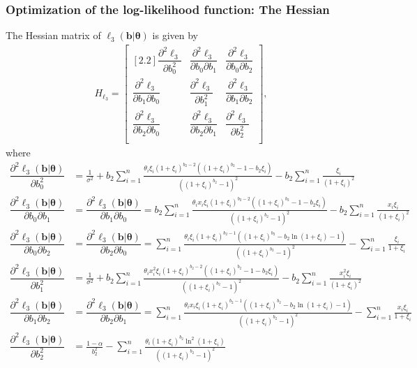\documentclass[11pt, letterpaper]{article}
\begin{document}
\subsubsection{Optimization of the log-likelihood function: The Hessian}
The Hessian matrix of $\ell_3(\bm b | \bm \theta)$ is given by
\begin{align*}
H_{\ell_3} = \begin{bmatrix}[2.2]
\dfrac{\partial^2 \ell_3}{\partial b_0 ^2} & \dfrac{\partial^2 \ell_3}{\partial b_0 \partial b_1} & \dfrac{\partial^2 \ell_3}{\partial b_0 \partial b_2} \\
\dfrac{\partial^2 \ell_3}{\partial b_1  \partial b_0} & \dfrac{\partial^2 \ell_3}{\partial b_1^2} & \dfrac{\partial^2 \ell_3}{\partial b_1 \partial b_2} \\
\dfrac{\partial^2 \ell_3}{\partial b_2  \partial b_0}  & \dfrac{\partial^2 \ell_3}{\partial b_2 \partial b_1} & \dfrac{\partial^2 \ell_3}{\partial b_2^2}\\
\end{bmatrix},
\end{align*}
where
\begin{align*}
\dfrac{\partial^2 \ell_3(\bm b | \bm \theta)}{\partial b_0 ^2} &=  \frac{1}{\sigma^2} + b_2 \sum_{i=1}^n \frac{\theta_i \xi_i (1+\xi_i)^{b_2-2}((1+\xi_i)^{b_2} - 1 - b_2 \xi_i)}{\left((1+\xi_i)^{b_2} - 1 \right)^2} -b_2 \sum_{i=1}^n \frac{ \xi_i}{(1+\xi_i )^2}\\
\dfrac{\partial^2 \ell_3(\bm b | \bm \theta)}{\partial b_0 \partial b_1} &= \dfrac{\partial^2 \ell_3(\bm b | \bm \theta)}{\partial b_1 \partial b_0} =  b_2 \sum_{i=1}^n \frac{\theta_ix_i \xi_i (1+\xi_i)^{b_2-2}((1+\xi_i)^{b_2} - 1 - b_2 \xi_i)}{\left((1+\xi_i)^{b_2} - 1 \right)^2} -b_2 \sum_{i=1}^n \frac{x_i \xi_i}{(1+\xi_i )^2}\\
\dfrac{\partial^2 \ell_3(\bm b | \bm \theta)}{\partial b_0 \partial b_2} &= \dfrac{\partial^2 \ell_3(\bm b | \bm \theta)}{\partial b_2 \partial b_0} = \sum_{i=1}^n \frac{\theta_i\xi_i(1+\xi_i)^{b_2-1}\left((1+\xi_i)^{b_2}- b_2 \ln (1+\xi_i) -1 \right)}{\left((1+\xi_i)^{b_2} - 1 \right)^2} - \sum_{i=1}^n \frac{\xi_i}{1+\xi_i}\\
\dfrac{\partial^2 \ell_3(\bm b | \bm \theta)}{\partial b_1 ^2} &= \frac{1}{\sigma^2} + b_2 \sum_{i=1}^n \frac{\theta_i x_i^2\xi_i (1+\xi_i)^{b_2-2}((1+\xi_i)^{b_2} - 1-b_2 \xi_i)}{\left((1+\xi_i)^{b_2} - 1 \right)^2} -b_2 \sum_{i=1}^n \frac{x_i^2 \xi_i}{(1+\xi_i )^2}\\
\dfrac{\partial^2 \ell_3(\bm b | \bm \theta)}{\partial b_1 \partial b_2} &= \dfrac{\partial^2 \ell_3(\bm b | \bm \theta)}{\partial b_2 \partial b_1} =  \sum_{i=1}^n \frac{\theta_i x_i\xi_i(1+\xi_i)^{b_2-1}\left((1+\xi_i)^{b_2}- b_2 \ln (1+\xi_i) -1 \right)}{\left((1+\xi_i)^{b_2} - 1 \right)^2} - \sum_{i=1}^n \frac{x_i\xi_i}{1+\xi_i}\\
\dfrac{\partial^2 \ell_3(\bm b | \bm \theta)}{\partial b_2 ^2} &= \frac{1-\alpha}{b_2^2} - \sum_{i=1}^n \frac{\theta_i(1+\xi_i)^{b_2}\ln ^2(1+\xi_i)}{\left((1+\xi_i)^{b_2} - 1 \right)^2} \\
\end{align*}
\end{document}
